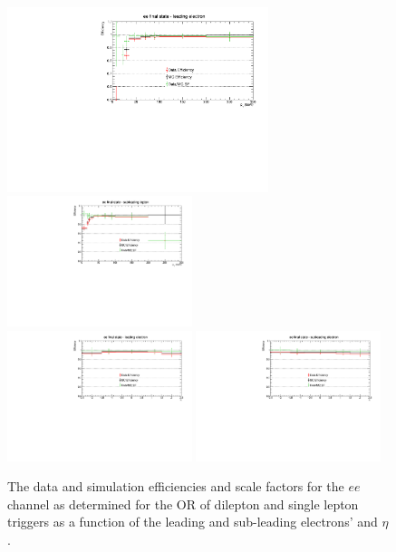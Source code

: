 \begin{figure}[ht]
\centering
\includegraphics[width=0.68\textwidth]{figs/background-estimation/triggerEfficiency/ttbar/electron1_pT_SF.pdf}
\includegraphics[width=0.48\textwidth]{figs/background-estimation/triggerEfficiency/ttbar/electron2_pT_SF.pdf}
\\
\includegraphics[width=0.48\textwidth]{figs/background-estimation/triggerEfficiency/ttbar/electron1_eta_SF.pdf}
\includegraphics[width=0.48\textwidth]{figs/background-estimation/triggerEfficiency/ttbar/electron2_eta_SF.pdf}
\caption{
The data and \ttbar simulation efficiencies and scale factors for the $ee$ channel as determined for the OR of dilepton and single lepton triggers as a function of the leading and sub-leading electrons' \pT and $\eta$.
}
\label{fig:App_trigEff_ee}
\end{figure}

